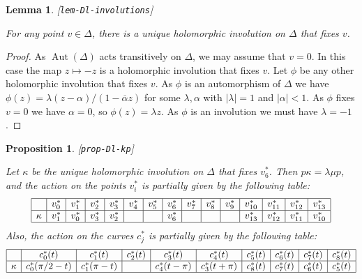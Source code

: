 \documentclass[reqno]{amsart}
\newcommand{\lbl}[1]{\label{#1}\textup{[\texttt{#1}]}\par}
\newcommand{\lbl}{\label}
\newcommand{\Aut}	{\operatorname{Aut}}
\newcommand{\Dl}        {\Delta}
\newcommand{\al}        {\alpha}
\newcommand{\kp}        {\kappa}
\newcommand{\lm}        {\lambda}
\newcommand{\ov}[1]     {\overline{#1}}
\renewcommand{\:}{\colon}
\newtheorem{lemma}[theorem]{Lemma}
\newtheorem{proposition}[theorem]{Proposition}
\theoremstyle{definition}
\begin{document}
\begin{lemma}\lbl{lem-Dl-involutions}
 For any point $v\in\Dl$, there is a unique holomorphic involution on
 $\Dl$ that fixes $v$.
\end{lemma}
\begin{proof}
 As $\Aut(\Dl)$ acts transitively on $\Dl$, we may assume that $v=0$.
 In this case the map $z\mapsto -z$ is a holomorphic involution that
 fixes $v$.  Let $\phi$ be any other holomorphic involution that
 fixes $v$.  As $\phi$ is an automorphism of $\Dl$ we have
 $\phi(z)=\lm(z-\al)/(1-\ov{\al}z)$ for some $\lm,\al$ with $|\lm|=1$
 and $|\al|<1$.  As $\phi$ fixes $v=0$ we have $\al=0$, so
 $\phi(z)=\lm z$.  As $\phi$ is an involution we must have $\lm=-1$.
\end{proof}

\begin{proposition}\lbl{prop-Dl-kp}
 Let $\kp$ be the unique holomorphic involution on $\Dl$ that fixes
 $v^*_6$.  Then $p\kp=\lm\mu p$, and the action on the points $v^*_i$
 is partially given by the following table:
 \[ \begin{array}{|c|c|c|c|c|c|c|c|c|c|c|c|c|c|c|}
    \hline
     &v_0^*&v^*_1&v^*_2&v^*_3&v^*_4&v^*_5&v^*_6&v^*_7&v^*_8&v^*_9&
      v^*_{10}&v^*_{11}&v^*_{12}&v^*_{13}\\ \hline
     \kp & v^*_1 & v^*_0 & v^*_3 & v^*_2 & & &
      v^*_6 & & & & v^*_{13} & v^*_{12} & v^*_{11}& v^*_{10}\\ \hline
 \end{array} \]
 Also, the action on the curves $c^*_j$ is partially given by the
 following table:
 \[ \begin{array}{|c|c|c|c|c|c|c|c|c|c|}
    \hline
     &c_0^*(t)&c^*_1(t)&c^*_2(t)&c^*_3(t)&c^*_4(t)&
      c^*_5(t)&c^*_6(t)&c^*_7(t)&c^*_8(t)\\ \hline
     \kp & c_0^*(\pi/2-t) & c_1^*(\pi-t) & &
           c_4^*(t-\pi) & c_3^*(t+\pi) &
           c_8^*(t) & c_7^*(t) & c_6^*(t) & c_5^*(t) \\ \hline
 \end{array} \]
\end{proposition}
\end{document}
